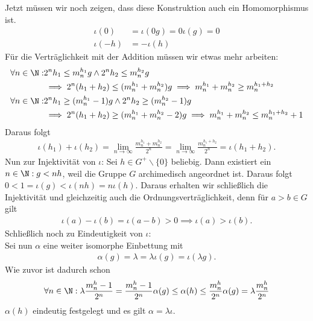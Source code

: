 \begin{solution}
Jetzt müssen wir noch zeigen, dass diese Konstruktion auch ein Homomorphismus ist.
\begin{align*}
  \iota(0) &= \iota(0g) = 0\iota(g) = 0 \\
  \iota(-h) &= -\iota(h)
\end{align*}
Für die Verträglichkeit mit der Addition müssen wir etwas mehr arbeiten:
\begin{align*}
  \forall n \in \N:& 2^nh_1 \leq m_n^{h_1}g \land 2^nh_2 \leq m_n^{h_2}g \\
  &\implies 2^n(h_1 + h_2) \leq (m_n^{h_1} + m_n^{h_2})g \implies m_n^{h_1} + m_n^{h_2} \geq m_n^{h_1 + h_2} \\
  \forall n \in \N:& 2^nh_1 \geq (m_n^{h_1}-1)g \land 2^nh_2 \geq (m_n^{h_2}-1)g \\
  &\implies 2^n(h_1 + h_2) \geq (m_n^{h_1} + m_n^{h_2} - 2)g \implies m_n^{h_1} + m_n^{h_2} \leq m_n^{h_1 + h_2} + 1
\end{align*}
Daraus folgt
\begin{align*}
  \iota(h_1) + \iota(h_2) = \lim_{n \rightarrow \infty} \frac{m_n^{h_1} + m_n^{h_2}}{2^n}
  = \lim_{n \rightarrow \infty} \frac{m_n^{h_1 + h_2}}{2^n} = \iota(h_1 + h_2).
\end{align*}
Nun zur Injektivität von $\iota$: Sei $h \in G^+\backslash\{0\}$ beliebig.
Dann existiert ein $n \in \N: g < nh$, weil die Gruppe $G$
archimedisch angeordnet ist. Daraus folgt $0 < 1 = \iota(g) < \iota(nh) = n\iota(h)$.
Daraus erhalten wir schließlich die Injektivität
und gleichzeitig auch die Ordnungsverträglichkeit, denn für $a > b \in G$ gilt
\begin{align*}
  \iota(a) - \iota(b) = \iota(a-b) > 0 \implies \iota(a) > \iota(b).
\end{align*}
Schließlich noch zu Eindeutigkeit von $\iota$: \\
Sei nun $\alpha$ eine weiter isomorphe Einbettung mit
\begin{align*}
  \alpha(g) = \lambda = \lambda \iota(g) = \iota(\lambda g).
\end{align*}
Wie zuvor ist dadurch schon
\begin{align*}
  \forall n \in \N: \lambda \frac{m_n^h - 1}{2^n} = \frac{m_n^h - 1}{2^n}\alpha(g) \leq \alpha(h) \leq \frac{m_n^h}{2^n}\alpha(g)
  = \lambda \frac{m_n^h}{2^n}
\end{align*}
$\alpha(h)$ eindeutig festgelegt und es gilt $\alpha = \lambda \iota$.
\end{solution}
